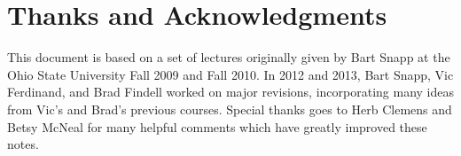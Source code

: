 \section*{Thanks and Acknowledgments}

This document is based on a set of lectures originally given by Bart
Snapp at the Ohio State University Fall 2009 and Fall 2010. In 2012 and 2013,
Bart Snapp, Vic Ferdinand, and Brad Findell worked on major revisions, incorporating
many ideas from Vic's and Brad's previous courses. Special thanks goes to Herb
Clemens and Betsy McNeal for many helpful comments
which have greatly improved these notes.



\makeatletter %
\renewcommand{\l@section}{\@dottedtocline{1}{5em}{5em}}
\renewcommand{\l@subsection}{\@dottedtocline{2}{5em}{5em}}
\renewcommand{\l@subsubsection}{\@dottedtocline{3}{5em}{5em}}
\makeatother

\setcounter{tocdepth}{1}
\tableofcontents









